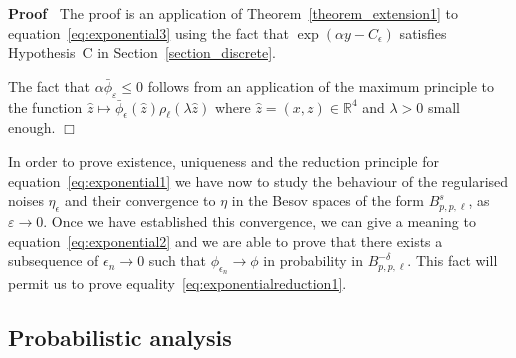 \documentclass[a4paper,10pt]{article}
\newenvironment{proof}{\noindent\textbf{Proof\ }}{\hspace*{\fill}$\Box$\medskip}
\begin{document}
\begin{proof}
  The proof is an application of Theorem~\ref{theorem_extension1} to
  equation~{\eqref{eq:exponential3}} using the fact that $\exp (\alpha y -
  C_{\epsilon})$ satisfies Hypothesis~C in Section~\ref{section_discrete}.
  
  The fact that $\alpha \bar{\phi}_{\varepsilon} \leqslant 0$ follows from an
  application of the maximum principle to the function $\hat{z} \mapsto
  \bar{\phi}_{\epsilon} (\hat{z}) \rho_{\ell} (\lambda \hat{z})$ where
  $\hat{z} = (x, z) \in \mathbb{R}^4$ and $\lambda > 0$ small enough.
\end{proof}

In order to prove existence, uniqueness and the reduction principle for
equation~{\eqref{eq:exponential1}} we have now to study the behaviour of the
regularised noises $\eta_{\epsilon}$ and their convergence to $\eta$ in the
Besov spaces of the form $B^s_{p, p, \ell}$, as $\varepsilon \rightarrow 0$.
Once we have established this convergence, we can give a meaning to
equation~{\eqref{eq:exponential2}} and we are able to prove that there exists
a subsequence of $\epsilon_n \rightarrow 0$ such that $\phi_{\epsilon_n}
\rightarrow \phi$ in probability in $B^{- \delta}_{p, p, \ell}$. This fact
will permit us to prove equality~{\eqref{eq:exponentialreduction1}}.

\subsection{Probabilistic analysis}\label{subsection_probabilistic}
\end{document}

